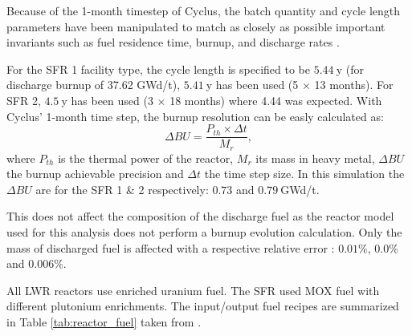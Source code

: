 \documentclass[12pt]{article}
\begin{document}

Because of the 1-month timestep of Cyclus, the batch quantity and cycle length
parameters have been manipulated to match as closely as possible important
invariants such as fuel residence time, burnup, and discharge rates
\cite{B.Feng_calculation}.

For the SFR 1 facility type, the cycle length is specified to be $5.44~$y (for
discharge burnup of 37.62 GWd/t), $5.41~$y has been used (5 $\times$ 13 months). For
SFR 2, $4.5~$y has been used (3 $\times$ 18 months) where 4.44 was expected. With
Cyclus' 1-month time step, the burnup resolution can be easly calculated as:
\begin{equation} \Delta BU = \frac{P_{th} \times \Delta t}{M_{r}},
\end{equation}
\noindent where $P_{th}$ is the thermal power of the reactor, $M_{r}$ its mass in
heavy metal, $\Delta BU$ the burnup achievable precision and $\Delta t$ the time
step size. In this simulation the $\Delta BU$ are for the SFR 1 \& 2 respectively:
$0.73$ and $0.79~$GWd/t.

This does not affect the composition of the discharge fuel as the reactor model
used for this analysis does not perform a burnup evolution calculation. Only the
mass of discharged fuel is affected with a respective relative error : $0.01 \%$,
$0.0 \%$ and $0.006 \%$.


All LWR reactors use enriched uranium fuel. The SFR used MOX fuel with
different plutonium enrichments. The input/output fuel recipes are summarized
in Table \ref{tab:reactor_fuel} taken from \cite{B.Feng_calculation}.
\end{document}
